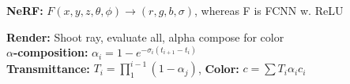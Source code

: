 \textbf{NeRF:} $F(x,y,z, \theta, \phi) \rightarrow (r,g,b,\sigma)$, whereas F is FCNN w. ReLU\\

\textbf{Render:} Shoot ray, evaluate all, alpha compose for color\\

\textbf{$\alpha$-composition:} $\alpha_i = 1- e^{-\sigma_i (t_{i+1} - t_i)}$\\
\textbf{Transmittance:} $T_i = \prod_1^{i-1} (1-\alpha_j)$, 
\textbf{Color:} $c = \sum T_i \alpha_i c_i$\\

